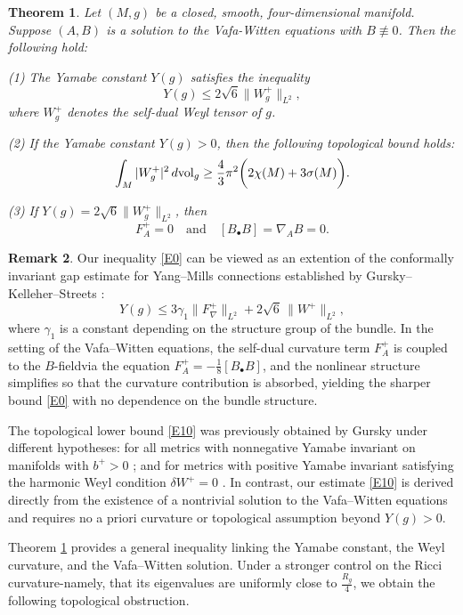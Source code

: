 \documentclass[12pt, twoside]{article}
\newtheorem{theorem}{Theorem}[section]
\theoremstyle{definition}
\newtheorem{remark}[theorem]{Remark}
\numberwithin{equation}{section}
\begin{document}
\begin{theorem}\label{T1}
Let $(M,g)$ be a closed, smooth, four-dimensional manifold. Suppose $(A,B)$ is a solution to the Vafa-Witten equations with $B\not\equiv0$. 
Then the following hold:

\noindent\textup{(1)} The Yamabe constant $Y(g)$ satisfies the inequality
\begin{equation} \label{E0}
Y(g)\leq 2\sqrt{6}\|W^{+}_{g}\|_{L^{2}},
\end{equation}
where $W^{+}_{g}$ denotes the self-dual Weyl tensor of $g$.

\noindent\textup{(2)} If the Yamabe constant $Y(g)>0$, then the following topological bound holds:
\begin{equation}\label{E10}
\int_{M}|W^{+}_{g}|^{2}\,d\mathrm{vol}_{g}\geq\frac{4}{3}\pi^{2}\bigg{(}2\chi(M)+3\sigma(M)\bigg{)}.
\end{equation}

\noindent\textup{(3)} If $Y(g)=2\sqrt{6}\|W^{+}_{g}\|_{L^{2}}$, then 
\[
F_{A}^{+}=0\quad\text{and}\quad [B_{\bullet}B]=\nabla_{A}B=0.
\]
\end{theorem}
\begin{remark}
Our inequality \eqref{E0} can be viewed as an extention of the conformally invariant gap estimate for Yang--Mills connections established by Gursky--Kelleher--Streets \cite[Theorem 1.1]{GKS18}:
\[Y(g) \le 3\gamma_1 \|F_\nabla^+\|_{L^2} + 2\sqrt{6}\,\|W^+\|_{L^2},\]
where $\gamma_1$ is a constant depending on the structure group of the bundle. In the setting of the Vafa--Witten equations, the self-dual curvature term $F_A^+$ is coupled to the $B$-fieldvia the equation $F_A^+ = -\frac{1}{8}[B_{\bullet} B]$, and the nonlinear structure simplifies so that the curvature contribution is absorbed, yielding the sharper bound \eqref{E0} with no dependence on the bundle structure.
	
The topological lower bound \eqref{E10} was previously obtained by Gursky under different hypotheses: for all metrics with nonnegative Yamabe invariant on manifolds with $b^{+}>0$ \cite[Theorem 1]{Gur98}; and for metrics with positive Yamabe invariant satisfying the harmonic Weyl condition $\delta W^+=0$ \cite[Theorem A]{Gur00}. In contrast, our estimate \eqref{E10} is derived directly from the existence of a nontrivial solution to the Vafa--Witten equations and requires no a priori curvature or topological assumption beyond $Y(g)>0$. 
\end{remark}
Theorem \ref{T1} provides a general inequality linking the Yamabe constant, the Weyl curvature, and the Vafa--Witten solution. Under a stronger control on the Ricci curvature-namely, that its eigenvalues are uniformly close to $\frac{R_{g}}{4}$, we obtain the following topological obstruction.
\end{document}
